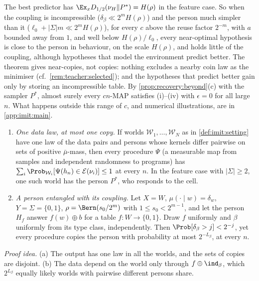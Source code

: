 The best predictor has $\Ex_xD_{1/2}(\nu_H\Vert P^*)=H(\rho)$ in the feature case. So when the coupling is incompressible ($\delta_\beta\ll2^mH(\rho)$) and the person much simpler than it ($\ell_0+|\Sigma|m\ll2^mH(\rho)$), for every $c$ above the reuse factor $2^{-m}$, with $a$ bounded away from $1$, and well below $H(\rho)/\ell_0$, every near-optimal hypothesis is close to the person in behaviour, on the scale $H(\rho)$, and holds little of the coupling, although hypotheses that model the environment predict better. The theorem gives near-copies, not copies: nothing excludes a nearby coin law as the minimiser (cf.\ \cref{rem:teacher:selected}); and the hypotheses that predict better gain only by storing an incompressible table. By \cref{prop:recovery:beyond}(c) with the sampler $P^*$, almost surely every $cn$-MAP satisfies (i)--(iv) with $\epsilon=0$ for all large $n$. What happens outside this range of $c$, and numerical illustrations, are in \cref{app:imit:main}.

\begin{proposition}\label{prop:imit:limits}
\begin{enumerate}[label=(\alph*),itemsep=1pt,topsep=2pt]
\item \emph{One data law, at most one copy.} If worlds $\mathcal W_1,\dots,\mathcal W_N$ as in \cref{def:imit:setting} have one law of the data pairs and persons whose kernels differ pairwise on sets of positive $\bar\mu$-mass, then every procedure $\Psi$ (a measurable map from samples and independent randomness to programs) has $\sum_i\Prob_{\mathcal W_i}[\Psi(h_n)\in\mathcal E(\nu_i)]\le1$ at every $n$. In the feature case with $|\Sigma|\ge2$, one such world has the person $P^*$, who responds to the cell.
\item \emph{A person entangled with its coupling.} Let $X=W$, $\mu(\cdot\mid w)=\delta_w$, $Y=\Sigma=\{0,1\}$, $\rho=\Bern(s_0/2^m)$ with $1\le s_0<2^{m-1}$, and let the person $H_f$ answer $f(w)\oplus b$ for a table $f:W\to\{0,1\}$. Draw $f$ uniformly and $\beta$ uniformly from its type class, independently. Then $\Prob[\delta_\beta>j]<2^{-j}$, yet every procedure copies the person with probability at most $2^{-L_\beta}$, at every $n$.
\end{enumerate}
\end{proposition}

\emph{Proof idea.} (a) The output has one law in all the worlds, and the sets of copies are disjoint. (b) The data depend on the world only through $f\oplus\ind_\beta$, which $2^{L_\beta}$ equally likely worlds with pairwise different persons share.

